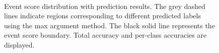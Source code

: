 \documentclass[12pt]{article}
\begin{document}
\begin{figure}[htpb]
{            }  
             \\  
            \caption{Event score distribution with prediction results. The grey dashed lines indicate regions corresponding to different predicted labels using the max argument method. The black solid line represents the event score boundary. Total accuracy and per-class accuracies are displayed.}  
            \label{fig:event_score_distribution_w_prediction_ambiguous_train_test_comparison}  
        \end{figure}
\end{document}
